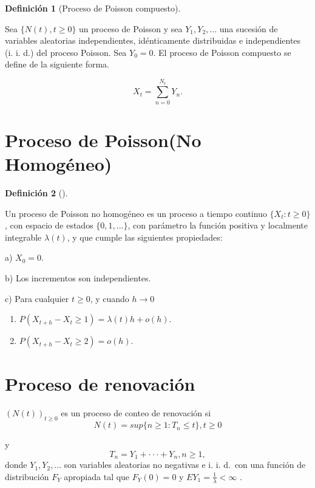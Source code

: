 \documentclass[
  us-letterpaper,
]{scrreprt}
\theoremstyle{plain}
\theoremstyle{plain}
\theoremstyle{definition}
\newtheorem{definition}{Definición}[chapter]
\theoremstyle{remark}
\begin{document}
\begin{definition}[Proceso de Poisson
compuesto]\protect\hypertarget{def-proc_poi_comp}{}\label{def-proc_poi_comp}

Sea \(\{N(t), t\geq0\}\) un proceso de Poisson y sea \(Y_1, Y_2,...\)
una sucesión de variables aleatorias independientes, idénticamente
distribuidas e independientes (i. i. d.) del proceso Poisson. Sea
\(Y_0 = 0\). El proceso de Poisson compuesto se define de la siguiente
forma.

\[
X_t = \sum_{n=0}^{N_t} Y_n.
\]

\end{definition}

\section{Proceso de Poisson(No
Homogéneo)}\label{proceso-de-poissonno-homoguxe9neo}

\begin{definition}[]\protect\hypertarget{def-pro_poi_n_hom}{}\label{def-pro_poi_n_hom}

Un proceso de Poisson no homogéneo es un proceso a tiempo continuo
\(\{X_t : t\geq0\}\) , con espacio de estados \(\{0, 1,...\}\), con
parámetro la función positiva y localmente integrable \(\lambda(t)\), y
que cumple las siguientes propiedades:

a) \(X_0 = 0\).

b) Los incrementos son independientes.

c) Para cualquier \(t\geq 0\), y cuando \(h \rightarrow 0\)

\begin{enumerate}
\def\labelenumi{\roman{enumi}.}
\item
  \(P(X_{t+h} -X_t \geq 1) =  \lambda(t)h + o(h)\).
\item
  \(P(X_{t+h} - X_t \geq 2) = o(h)\).
\end{enumerate}

\end{definition}

\label{def_proc_reno}
\section{Proceso de renovación}\label{proceso-de-renovaciuxf3n}

\((N(t))_{t\geq 0}\) es un proceso de conteo de renovación si
\[N(t) = sup\{n \geq 1 : T_n \leq t\}, t \geq 0\]

y \[T_n = Y_1 + · · · + Y_n, n \geq 1,\] donde \(Y_1, Y_2, . . .\) son
variables aleatorias no negativas e i. i. d.~con una función de
distribución \(F_Y\) apropiada tal que \(F_Y(0) = 0\) y
\(EY_1 = \frac{1}{\lambda}< \infty\) .
\end{document}
